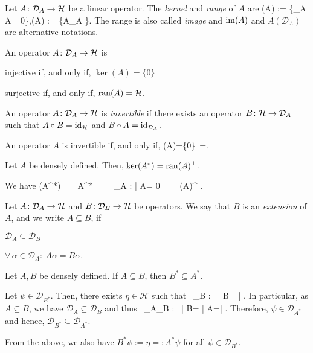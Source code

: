 \bd
Let $A\colon \mathcal{D}_A\to \mathcal{H}$ be a linear operator. The \emph{kernel} and \emph{range} of $A$ are
\bse
\ker (A)  :=  \{\alpha \in {}_A \mid A\alpha = 0\},\quad\qquad\ran (A)  :=  \{A\alpha \mid \alpha \in {}_A \}.
\ese
The range is also called \emph{image} and $\operatorname{im} (A)$ and $A(\mathcal{D}_A)$ are alternative notations.
\ed

\bp
An operator $A\colon \mathcal{D}_A\to \mathcal{H}$ is
\ben[label=(\roman*)]
\item injective if, and only if, $\ker(A)=\{0\}$
\item surjective if, and only if, $\operatorname{ran}(A)=\mathcal{H}$.
\een
\ep

\bd
An operator $A\colon \mathcal{D}_A\to \mathcal{H}$ is \emph{invertible} if there exists an operator $B\colon\mathcal{H}\to \mathcal{D}_A$ such that $A\circ B = \operatorname{id}_{\mathcal{H}}$ and $B\circ A = \operatorname{id}_{\mathcal{D}_A}$.
\ed

\bp
An operator $A$ is invertible if, and only if, 
\bse
\ker(A)=\{0\}\quad {}\quad\, =.
\ese
\ep

\bp
\label{prp:kerran}
Let $A$ be densely defined. Then, $\ker(A^*)=\operatorname{ran}(A)^{\perp}$.
\ep

\bq
We have
\bse
\psi\in\ker(A^*)\ \ \Leftrightarrow\ \ A^*\ \ \Leftrightarrow\ \ \forall \, \alpha \in {}_A : \langle \psi | A\alpha \rangle = 0 \ \ \Leftrightarrow\ \ \psi \in \ran(A)^{\perp} .\qedhere
\ese
\eq

\bd
Let $A\colon \mathcal{D}_A \to \mathcal{H}$ and $B\colon \mathcal{D}_B \to \mathcal{H}$ be operators. We say that $B$ is an \emph{extension} of $A$, and we write $A\subseteq B$, if
\ben[label=(\roman*)]
\item $\mathcal{D}_{A}\subseteq \mathcal{D}_{B}$
\item $\forall \, \alpha \in \mathcal{D}_{A} : \ A\alpha = B \alpha$.
\een
\ed

\bp
\label{prp:adjointreverse}
Let $A,B$ be densely defined. If $A\subseteq B$, then $B^*\subseteq A^*$.
\ep

\bq
\ben[label=(\roman*)]
\item Let $\psi \in \mathcal{D}_{B^*}$. Then, there exists $\eta\in\mathcal{H}$ such that
\bse
\forall \, \beta \in {}_B : \ \langle \psi | B\beta \rangle = \langle \eta | \beta \rangle.
\ese
In particular, as $A\subseteq B$, we have $\mathcal{D}_A\subseteq\mathcal{D}_B$ and thus
\bse
\forall \, \alpha \in {}_A\subseteq{}_B : \ \langle \psi | B\alpha \rangle = \langle \psi | A\alpha \rangle =\langle \eta | \alpha \rangle.
\ese
Therefore, $\psi \in \mathcal{D}_{A^*}$ and hence, $\mathcal{D}_{B^*}\subseteq \mathcal{D}_{A^*}$.
\item From the above, we also have $B^*\psi := \eta =: A^*\psi$ for all $\psi \in \mathcal{D}_{B^*}$.\qedhere
\een
\eq


